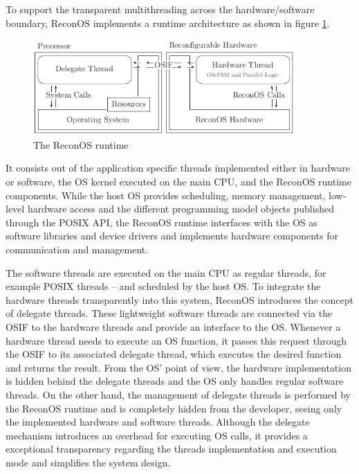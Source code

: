 To support the transparent multithreading across the hardware/software
boundary, ReconOS implements a runtime architecture as shown in figure
\ref{fig:reconos_runtime}.
\begin{figure}[tb]
	\centering
	\includegraphics[width=10cm]{../figures/reconos_hwt}
	\caption{The ReconOS runtime}
	\label{fig:reconos_runtime}
\end{figure}
It consists out of the application specific threads implemented either in
hardware or software, the \ac{OS} kernel executed on the main \ac{CPU}, and the
ReconOS runtime components. While the host \ac{OS} provides scheduling, memory
management, low-level hardware access and the different programming model
objects published through the \ac{POSIX} API, the ReconOS runtime interfaces
with the \ac{OS} as software libraries and device drivers and implements
hardware components for communication and management.

The software threads are executed on the main \ac{CPU} as regular threads, for
example \ac{POSIX} threads -- and scheduled by the host \ac{OS}. To integrate
the hardware threads transparently into this system, ReconOS introduces the
concept of delegate threads. These lightweight software threads are connected
via the \ac{OSIF} to the hardware threads and provide an interface to the
\ac{OS}. Whenever a hardware thread needs to execute an \ac{OS} function, it
passes this request through the \ac{OSIF} to its associated delegate thread,
which executes the desired function and returns the result. From the \ac{OS}'
point of view, the hardware implementation is hidden behind the delegate
threads and the \ac{OS} only handles regular software threads. On the other
hand, the management of delegate threads is performed by the ReconOS runtime
and is completely hidden from the developer, seeing only the implemented
hardware and software threads. Although the delegate mechanism introduces an
overhead for executing \ac{OS} calls, it provides a exceptional transparency
regarding the threads implementation and execution mode and simplifies the
system design.

